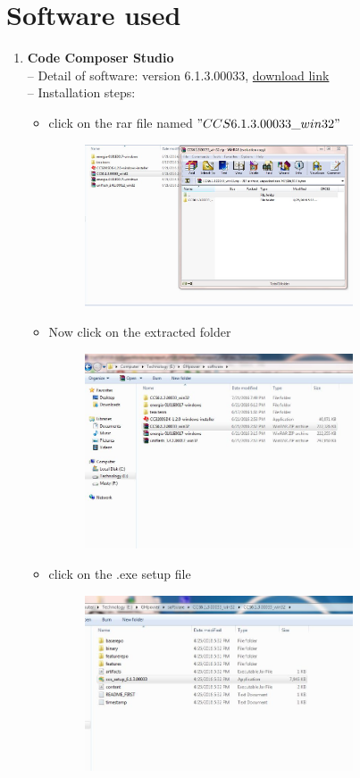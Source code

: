 \documentclass[a4paper,12pt,oneside]{book}
\begin{document}
\section{Software used}
\begin{enumerate}
	\item\textbf{ Code Composer Studio} \\
  -- Detail of software: version 6.1.3.00033, \href{http://www.ti.com}{download link}\\
  -- Installation steps:
  \begin{itemize}
  	\item click on the rar file named $"CCS6.1.3.00033\_win32"$
  	  \begin{figure}[h]
  	  	\hspace{2cm}
  	 	\includegraphics[width=300px]{inst1}
  	 \end{figure}
  	 	 \item Now click on the extracted folder
  	  \begin{figure}[h]
  	  		\hspace{2cm}
  	 	\includegraphics[width=300px]{inst2}
  	 \end{figure}
  	 \newpage
  	 \item click on the .exe setup file
  	 \begin{figure}[h]
  	 		\hspace{2cm}
  	  	\includegraphics[width=300px]{inst3}

\end{figure}
\end{itemize}
\end{enumerate}
\end{document}
